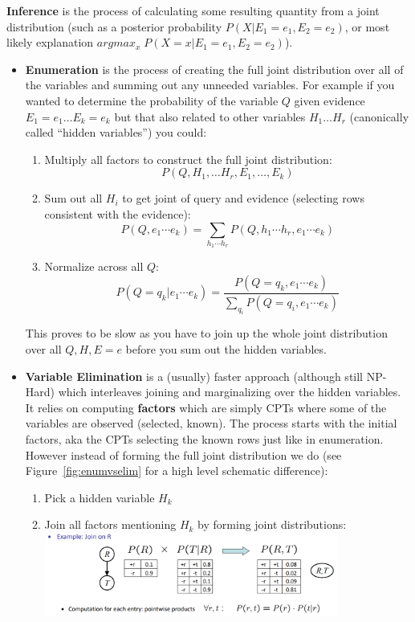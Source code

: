 \documentclass[11pt]{article}
\begin{document}
\textbf{Inference} is the process of calculating some resulting quantity from a joint distribution (such as a posterior probability $P(X|E_1=e_1,E_2=e_2)$, or most likely explanation $argmax_x \; P(X=x|E_1=e_1,E_2=e_2)$).
\begin{itemize}
    \item \textbf{Enumeration} is the process of creating the full joint distribution over all of the variables and summing out any unneeded variables. For example if you wanted to determine the probability of the variable $Q$ given evidence $E_1=e_1 \ldots E_k = e_k$ but that also related to other variables $H_1 \ldots H_r$ (canonically called ``hidden variables'') you could:
    \begin{enumerate}
        \item Multiply all factors to construct the full joint distribution:
        $$P(Q, H_1, \dots H_r, E_1, \dots, E_k)$$
        \item Sum out all $H_i$ to get joint of query and evidence (selecting rows consistent with the evidence):
        $$P(Q, e_1 \cdots e_k) = \sum_{h_1 \cdots h_r} P(Q, h_1 \cdots h_r, e_1 \cdots e_k)$$
        \item Normalize across all $Q$:
        $$P(Q=q_k | e_1 \cdots e_k) = \frac{P(Q=q_k, e_1 \cdots e_k)}{\sum_{q_i} P(Q=q_i, e_1 \cdots e_k)}$$
    \end{enumerate}
    This proves to be slow as you have to join up the whole joint distribution over all $Q,H,E=e$ before you sum out the hidden variables.
    \item \textbf{Variable Elimination} is a (usually) faster approach (although still NP-Hard) which interleaves joining and marginalizing over the hidden variables. It relies on computing \textbf{factors} which are simply CPTs where some of the variables are observed (selected, known). The process starts with the initial factors, aka the CPTs selecting the known rows just like in enumeration. However instead of forming the full joint distribution we do (see Figure~\ref{fig:enumvselim} for a high level schematic difference):
    \begin{enumerate}
        \item Pick a hidden variable $H_k$
        \item Join all factors mentioning $H_k$ by forming joint distributions:\\
        \includegraphics[width=0.8\textwidth]{figs/join.png}

\end{enumerate}
\end{itemize}
\end{document}
